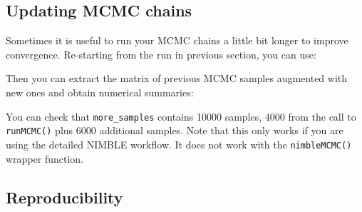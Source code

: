 \documentclass[
  12pt,
]{krantz}
\newenvironment{Shaded}{\begin{snugshade}}{\end{snugshade}}
\newcommand{\AttributeTok}[1]{\textcolor[rgb]{0.13,0.29,0.53}{#1}}
\newcommand{\ConstantTok}[1]{\textcolor[rgb]{0.56,0.35,0.01}{#1}}
\newcommand{\DecValTok}[1]{\textcolor[rgb]{0.00,0.00,0.81}{#1}}
\newcommand{\DocumentationTok}[1]{\textcolor[rgb]{0.56,0.35,0.01}{\textbf{\textit{#1}}}}
\newcommand{\FunctionTok}[1]{\textcolor[rgb]{0.13,0.29,0.53}{\textbf{#1}}}
\newcommand{\NormalTok}[1]{#1}
\newcommand{\OtherTok}[1]{\textcolor[rgb]{0.56,0.35,0.01}{#1}}
\newcommand{\SpecialCharTok}[1]{\textcolor[rgb]{0.81,0.36,0.00}{\textbf{#1}}}
\begin{document}
\subsection{Updating MCMC chains}\label{updating-mcmc-chains}

Sometimes it is useful to run your MCMC chains a little bit longer to improve convergence. Re-starting from the run in previous section, you can use:

\begin{Shaded}
\end{Shaded}

Then you can extract the matrix of previous MCMC samples augmented with new ones and obtain numerical summaries:

\begin{Shaded}
\end{Shaded}

You can check that \texttt{more\_samples} contains 10000 samples, 4000 from the call to \texttt{runMCMC()} plus 6000 additional samples. Note that this only works if you are using the detailed NIMBLE workflow. It does not work with the \texttt{nimbleMCMC()} wrapper function.

\subsection{Reproducibility}\label{tipreproducibility}
\end{document}
